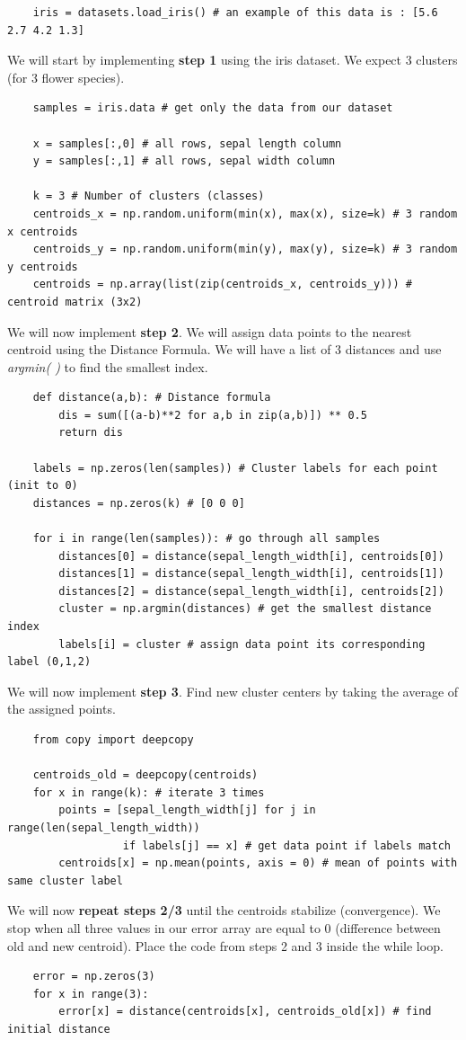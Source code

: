 \documentclass[11pt, a4paper]{article}
\begin{document}
\begin{spacing}{1.1}
\begin{lstlisting}
	iris = datasets.load_iris() # an example of this data is : [5.6 2.7 4.2 1.3] \end{lstlisting} \vspace*{1mm}
	We will start by implementing \textbf{step 1} using the iris dataset. We expect 3 clusters (for 3 flower species). 
	\begin{lstlisting}
	samples = iris.data # get only the data from our dataset
	
	x = samples[:,0] # all rows, sepal length column
	y = samples[:,1] # all rows, sepal width column
	
	k = 3 # Number of clusters (classes)
	centroids_x = np.random.uniform(min(x), max(x), size=k) # 3 random x centroids
	centroids_y = np.random.uniform(min(y), max(y), size=k) # 3 random y centroids
	centroids = np.array(list(zip(centroids_x, centroids_y))) # centroid matrix (3x2) \end{lstlisting} \vspace*{1mm}
	We will now implement \textbf{step 2}. We will assign data points to the nearest centroid using the Distance Formula. We will have a list of 3 distances and use \textit{argmin( )} to find the smallest index.
	\begin{lstlisting}
	def distance(a,b): # Distance formula
		dis = sum([(a-b)**2 for a,b in zip(a,b)]) ** 0.5
		return dis
	
	labels = np.zeros(len(samples)) # Cluster labels for each point (init to 0)
	distances = np.zeros(k) # [0 0 0]
	
	for i in range(len(samples)): # go through all samples
		distances[0] = distance(sepal_length_width[i], centroids[0])
		distances[1] = distance(sepal_length_width[i], centroids[1])
		distances[2] = distance(sepal_length_width[i], centroids[2])
		cluster = np.argmin(distances) # get the smallest distance index
		labels[i] = cluster # assign data point its corresponding label (0,1,2) \end{lstlisting} \newpage
	
	\noindent We will now implement \textbf{step 3}. Find new cluster centers by taking the average of the assigned points.
	\begin{lstlisting}
	from copy import deepcopy
	
	centroids_old = deepcopy(centroids) 
	for x in range(k): # iterate 3 times
		points = [sepal_length_width[j] for j in range(len(sepal_length_width)) 
		          if labels[j] == x] # get data point if labels match
		centroids[x] = np.mean(points, axis = 0) # mean of points with same cluster label \end{lstlisting} \vspace*{1mm}
	We will now \textbf{repeat steps 2/3} until the centroids stabilize (convergence). We stop when all three values in our error array are equal to 0 (difference between old and new centroid). Place the code from steps 2 and 3 inside the while loop.
	\begin{lstlisting}
	error = np.zeros(3)
	for x in range(3):
		error[x] = distance(centroids[x], centroids_old[x]) # find initial distance
		

\end{lstlisting}
\end{spacing}
\end{document}
